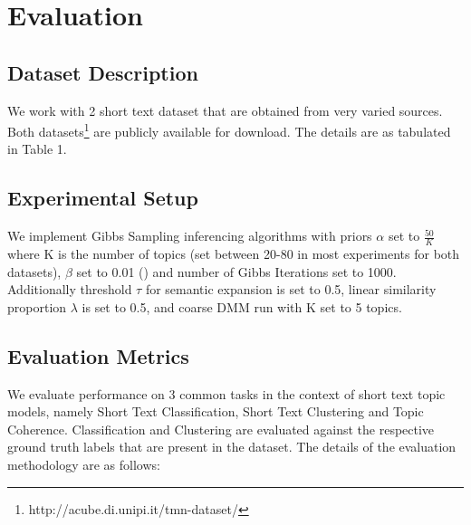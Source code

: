 \documentclass{sig-alternate-05-2015}
\begin{document}
\section{Evaluation}
\subsection{Dataset Description}
We work with 2 short text dataset that are obtained from very varied sources. Both datasets\footnote{http://acube.di.unipi.it/tmn-dataset/} are publicly available for download. The details are as tabulated in Table 1.

\subsection{Experimental Setup}
We implement Gibbs Sampling inferencing algorithms with priors $\alpha$ set to $\frac{50}{K}$ where K is the number of topics (set between 20-80 in most experiments for both datasets), $\beta$ set to 0.01 (\cite{btm,dmm}) and number of Gibbs Iterations set to 1000. Additionally threshold $\tau$ for semantic expansion is set to 0.5, linear similarity proportion $\lambda$ is set to 0.5, and coarse DMM run with K set to 5 topics.

\subsection{Evaluation Metrics}
We evaluate performance on 3 common tasks in the context of short text topic models, namely Short Text Classification, Short Text Clustering and Topic Coherence. Classification and Clustering are evaluated against the respective ground truth labels that are present in the dataset. The details of the evaluation methodology are as follows:
\end{document}
